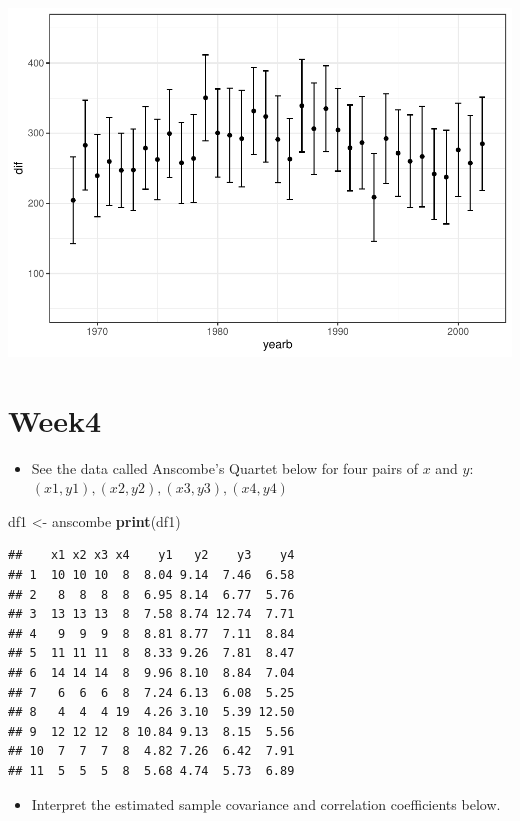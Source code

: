 \documentclass[
]{book}
\newenvironment{Shaded}{\begin{snugshade}}{\end{snugshade}}
\newcommand{\KeywordTok}[1]{\textcolor[rgb]{0.13,0.29,0.53}{\textbf{#1}}}
\newcommand{\NormalTok}[1]{#1}
\newcommand{\StringTok}[1]{\textcolor[rgb]{0.31,0.60,0.02}{#1}}
\providecommand{\tightlist}{%
  \setlength{\itemsep}{0pt}\setlength{\parskip}{0pt}}
\begin{document}
\includegraphics{Metrics_files/figure-latex/unnamed-chunk-16-1.pdf}

\hypertarget{week4}{%
\section{Week4}\label{week4}}

\begin{itemize}
\tightlist
\item
  See the data called Anscombe's Quartet below for four pairs of \(x\) and \(y\): \((x1,y1), (x2,y2), (x3, y3), (x4,y4)\)
\end{itemize}

\begin{Shaded}
\begin{Highlighting}[]
\NormalTok{df1 <-}\StringTok{ }\NormalTok{anscombe}
\KeywordTok{print}\NormalTok{(df1)}
\end{Highlighting}
\end{Shaded}

\begin{verbatim}
##    x1 x2 x3 x4    y1   y2    y3    y4
## 1  10 10 10  8  8.04 9.14  7.46  6.58
## 2   8  8  8  8  6.95 8.14  6.77  5.76
## 3  13 13 13  8  7.58 8.74 12.74  7.71
## 4   9  9  9  8  8.81 8.77  7.11  8.84
## 5  11 11 11  8  8.33 9.26  7.81  8.47
## 6  14 14 14  8  9.96 8.10  8.84  7.04
## 7   6  6  6  8  7.24 6.13  6.08  5.25
## 8   4  4  4 19  4.26 3.10  5.39 12.50
## 9  12 12 12  8 10.84 9.13  8.15  5.56
## 10  7  7  7  8  4.82 7.26  6.42  7.91
## 11  5  5  5  8  5.68 4.74  5.73  6.89
\end{verbatim}

\begin{itemize}
\tightlist
\item
  Interpret the estimated sample covariance and correlation coefficients below.
\end{itemize}
\end{document}
